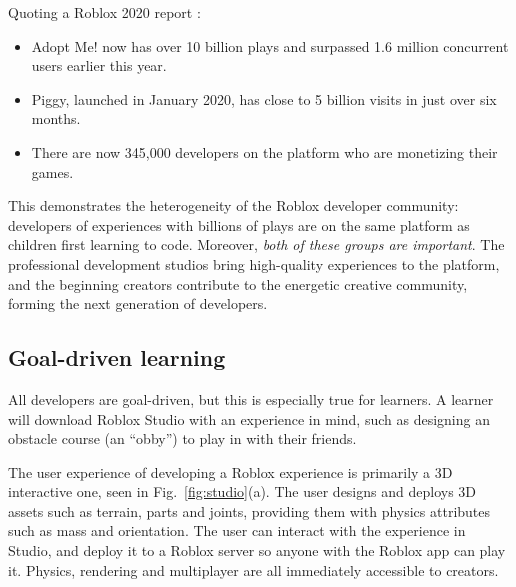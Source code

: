 \documentclass[acmsmall]{acmart}
\begin{document}
Quoting a Roblox 2020 report \cite{RobloxDevelopers}:
\begin{itemize}
\item Adopt Me! now has over 10 billion plays and surpassed 1.6 million concurrent users earlier this year.
\item Piggy, launched in January 2020, has close to 5 billion visits in just over six months.
\item There are now 345,000 developers on the platform who are monetizing their games.
\end{itemize}
This demonstrates the heterogeneity of the Roblox developer community:
developers of experiences with billions of plays are on the same
platform as children first learning to code. Moreover, \emph{both of
these groups are important}. The professional development studios
bring high-quality experiences to the platform, and the beginning creators
contribute to the energetic creative community, forming the next generation of developers.

\subsection{Goal-driven learning}

All developers are goal-driven, but this is especially true for
learners. A learner will download Roblox Studio with an
experience in mind, such as designing an obstacle course (an ``obby'')
to play in with their friends.

The user experience of developing a Roblox experience is primarily a
3D interactive one, seen in Fig.~\ref{fig:studio}(a). The user designs
and deploys 3D assets such as terrain, parts and joints, providing
them with physics attributes such as mass and orientation. The user
can interact with the experience in Studio, and deploy it to a Roblox
server so anyone with the Roblox app can play it. Physics, rendering
and multiplayer are all immediately accessible to creators.
\end{document}
